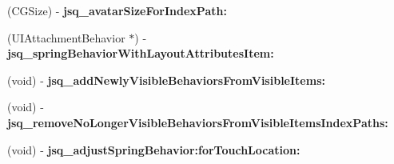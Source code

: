 \begin{DoxyCompactItemize}
\item 
\hypertarget{category_j_s_q_messages_collection_view_flow_layout_07_08_a42002d4f561132d75498bfbf2c563de3}{}(C\+G\+Size) -\/ {\bfseries jsq\+\_\+avatar\+Size\+For\+Index\+Path\+:}\label{category_j_s_q_messages_collection_view_flow_layout_07_08_a42002d4f561132d75498bfbf2c563de3}

\item 
\hypertarget{category_j_s_q_messages_collection_view_flow_layout_07_08_a3232c4c6faaa75c4a2ed05e3ac872ed1}{}(U\+I\+Attachment\+Behavior $\ast$) -\/ {\bfseries jsq\+\_\+spring\+Behavior\+With\+Layout\+Attributes\+Item\+:}\label{category_j_s_q_messages_collection_view_flow_layout_07_08_a3232c4c6faaa75c4a2ed05e3ac872ed1}

\item 
\hypertarget{category_j_s_q_messages_collection_view_flow_layout_07_08_a903ec5dda3059b53c2b98a64f0c37153}{}(void) -\/ {\bfseries jsq\+\_\+add\+Newly\+Visible\+Behaviors\+From\+Visible\+Items\+:}\label{category_j_s_q_messages_collection_view_flow_layout_07_08_a903ec5dda3059b53c2b98a64f0c37153}

\item 
\hypertarget{category_j_s_q_messages_collection_view_flow_layout_07_08_ab84024111f662ce5f0e314a7fbc07cef}{}(void) -\/ {\bfseries jsq\+\_\+remove\+No\+Longer\+Visible\+Behaviors\+From\+Visible\+Items\+Index\+Paths\+:}\label{category_j_s_q_messages_collection_view_flow_layout_07_08_ab84024111f662ce5f0e314a7fbc07cef}

\item 
\hypertarget{category_j_s_q_messages_collection_view_flow_layout_07_08_ad1521c086dd6600bedbf19c780c4709c}{}(void) -\/ {\bfseries jsq\+\_\+adjust\+Spring\+Behavior\+:for\+Touch\+Location\+:}\label{category_j_s_q_messages_collection_view_flow_layout_07_08_ad1521c086dd6600bedbf19c780c4709c}

\end{DoxyCompactItemize}
